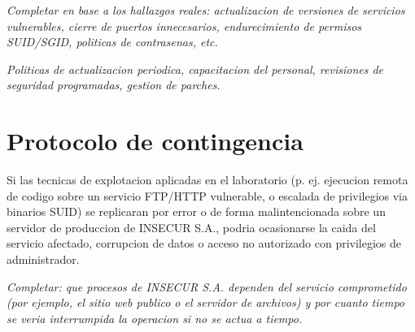 \documentclass[11pt,a4paper]{article}
\begin{document}
\begin{campo}
\textit{Completar en base a los hallazgos reales: actualizacion de versiones de servicios vulnerables, cierre de puertos innecesarios, endurecimiento de permisos SUID/SGID, politicas de contrasenas, etc.}
\vspace{3cm}
\end{campo}

\begin{campo}
\textit{Politicas de actualizacion periodica, capacitacion del personal, revisiones de seguridad programadas, gestion de parches.}
\vspace{2cm}
\end{campo}

\section{Protocolo de contingencia}

\begin{campo}
Si las tecnicas de explotacion aplicadas en el laboratorio (p. ej. ejecucion remota de codigo sobre un servicio FTP/HTTP vulnerable, o escalada de privilegios via binarios SUID) se replicaran por error o de forma malintencionada sobre un servidor de produccion de INSECUR S.A., podria ocasionarse la caida del servicio afectado, corrupcion de datos o acceso no autorizado con privilegios de administrador.
\end{campo}

\begin{campo}
\textit{Completar: que procesos de INSECUR S.A. dependen del servicio comprometido (por ejemplo, el sitio web publico o el servidor de archivos) y por cuanto tiempo se veria interrumpida la operacion si no se actua a tiempo.}
\vspace{2cm}
\end{campo}
\end{document}
